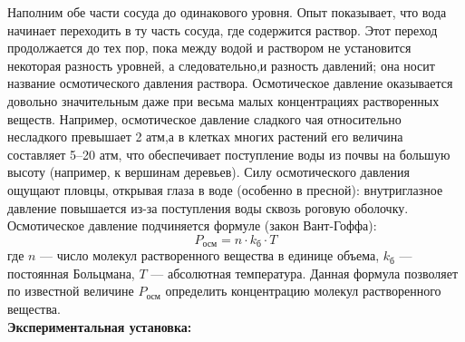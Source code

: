 \documentclass[a4paper, 12pt]{article}%
\begin{document}
		\begin{figure}[H]
	\end{figure}
 Наполним обе части сосуда до одинакового уровня. Опыт показывает, что вода начинает переходить в ту
	часть сосуда, где содержится раствор. Этот переход продолжается
	до тех пор, пока между водой и раствором не	установится некоторая
	разность уровней, а следовательно,и разность давлений; она носит название осмотического давления раствора. Осмотическое давление оказывается довольно значительным даже при весьма малых	концентрациях растворенных веществ. Например, осмотическое давление сладкого чая относительно несладкого
	превышает 2 атм,а в клетках многих растений его величина составляет 5–20 атм, что обеспечивает поступление воды из почвы на большую высоту (например,
	к вершинам деревьев). Силу осмотического давления ощущают пловцы, открывая глаза в воде (особенно в пресной): внутриглазное давление повышается из-за поступления воды сквозь роговую оболочку.
	Осмотическое давление подчиняется формуле (закон Вант-Гоффа):
$$ P_{\text{осм}} = n\cdot k_{\text{б}}\cdot T $$
	где	$n$ — число молекул растворенного вещества в единице объема,
	$ k_{\text{б}}$ — постоянная Больцмана,
	$T$ — абсолютная температура. Данная формула позволяет по известной величине
	$P_{\text{осм}}$ определить	концентрацию молекул растворенного вещества.\\

    \textbf{Экспериментальная установка: }\\
    
\end{document}
